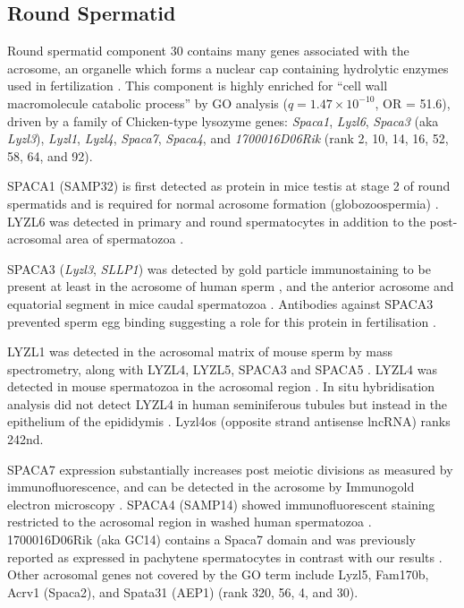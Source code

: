 \subsection{Round Spermatid}
Round spermatid component 30 contains many genes associated with the acrosome, an organelle which forms a nuclear cap containing hydrolytic enzymes used in fertilization \parencite{Ito2016Acrosome}. This component is highly enriched for ``cell wall macromolecule catabolic process'' by GO analysis  ($q = 1.47\times10^{-10}$, OR = 51.6), driven by a family of Chicken-type lysozyme genes: \textit{Spaca1}, \textit{Lyzl6}, \textit{Spaca3} (aka \textit{Lyzl3}), \textit{Lyzl1}, \textit{Lyzl4}, \textit{Spaca7}, \textit{Spaca4}, and \textit{1700016D06Rik} (rank 2, 10, 14, 16, 52, 58, 64, and 92).

SPACA1 (SAMP32) is first detected as protein in mice testis at stage 2 of round spermatids and is required for normal acrosome formation (globozoospermia) \parencite{Hao2002SAMP32,Fujihara2012SPACA1deficient}. LYZL6 was detected in primary and round spermatocytes in addition to the post-acrosomal area of spermatozoa \parencite{Wei2013Characterisation}.
 
SPACA3 (\textit{Lyzl3}, \textit{SLLP1}) was detected by gold particle immunostaining to be present at least in the acrosome of human sperm \parencite{Mandal2003SLLP1}, and the anterior acrosome and equatorial segment in mice caudal spermatozoa \parencite{Herrero2005Mouse}. Antibodies against SPACA3 prevented sperm egg binding suggesting a role for this protein in fertilisation \parencite{Herrero2005Mouse}.

LYZL1 was detected in the acrosomal matrix of mouse sperm by mass spectrometry, along with LYZL4, LYZL5, SPACA3 and SPACA5 \parencite{Guyonnet2012Isolation}. LYZL4 was detected in mouse spermatozoa in the acrosomal region \parencite{Sun2011Lyzl4}. In situ hybridisation analysis did not detect LYZL4 in human seminiferous tubules but instead in the epithelium of the epididymis \parencite{Zhang2005Molecular}. Lyzl4os (opposite strand antisense lncRNA) ranks 242nd.

SPACA7 expression substantially increases post meiotic divisions as measured by immunofluorescence, and can be detected in the acrosome by Immunogold electron microscopy \parencite{Korfanty2012Identification,Nguyen2014SPACA7}. SPACA4 (SAMP14) showed immunofluorescent staining restricted to the acrosomal region in washed human spermatozoa \parencite{Shetty2003SAMP14}. 1700016D06Rik (aka GC14) contains a Spaca7 domain and was previously reported as expressed in pachytene spermatocytes in contrast with our results \parencite{Anway2003Expression}. Other acrosomal genes not covered by the GO term include Lyzl5, Fam170b, Acrv1 (Spaca2), and Spata31 (AEP1) (rank 320, 56, 4, and 30).

